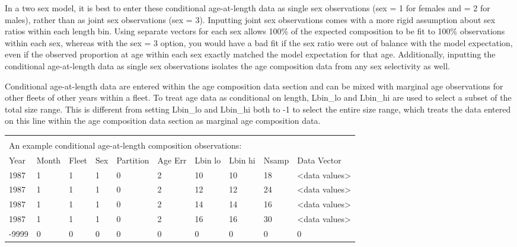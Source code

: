 In a two sex model, it is best to enter these conditional age-at-length data as single sex observations (sex = 1 for females and = 2 for males), rather than as joint sex observations (sex = 3). Inputting joint sex observations comes with a more rigid assumption about sex ratios within each length bin. Using separate vectors for each sex allows 100\% of the expected composition to be fit to 100\% observations within each sex, whereas with the sex = 3 option, you would have a bad fit if the sex ratio were out of balance with the model expectation, even if the observed proportion at age within each sex exactly matched the model expectation for that age. Additionally, inputting the conditional age-at-length data as single sex observations isolates the age composition data from any sex selectivity as well.

Conditional age-at-length data are entered within the age composition data section and can be mixed with marginal age observations for other fleets of other years within a fleet. To treat age data as conditional on length, Lbin\_lo and Lbin\_hi are used to select a subset of the total size range. This is different from setting Lbin\_lo and Lbin\_hi both to -1 to select the entire size range, which treats the data entered on this line within the age composition data section as marginal age composition data.  

\vspace*{-\baselineskip}
\begin{tabular}{p{1cm} p{1cm} p{1cm} p{1cm} p{1.5cm} p{1cm} p{1cm} p{1cm} p{1cm} p{2.5cm}}
	\multicolumn{10}{l}{} \\
	\multicolumn{10}{l}{An example conditional age-at-length composition observations:} \\
	\hline
	Year & Month & Fleet & Sex & Partition & Age Err & Lbin lo & Lbin hi & Nsamp & Data Vector \Tstrut\\
	\hline
	1987 & 1 & 1 & 1 & 0 & 2 & 10 & 10 & 18 & <data values> \Tstrut\\
	1987 & 1 & 1 & 1 & 0 & 2 & 12 & 12 & 24 & <data values> \Tstrut\\
	1987 & 1 & 1 & 1 & 0 & 2 & 14 & 14 & 16 & <data values> \Tstrut\\
	1987 & 1 & 1 & 1 & 0 & 2 & 16 & 16 & 30 & <data values> \Tstrut\\
	-9999 & 0 & 0 & 0 & 0 & 0 & 0 & 0 & 0 & 0 \Bstrut\\
	\hline
\end{tabular}
\leavevmode\tagmcend\tagstructend\par

